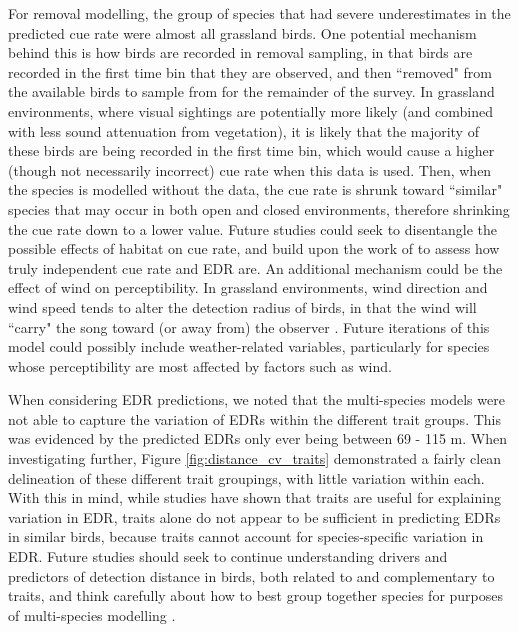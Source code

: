 \documentclass[12pt]{article}
\begin{document}
\par For removal modelling, the group of species that had severe underestimates in the predicted cue rate were almost all grassland birds.
One potential mechanism behind this is how birds are recorded in removal sampling, in that birds are recorded in the first time bin that they are observed, and then ``removed" from the available birds to sample from for the remainder of the survey.
In grassland environments, where visual sightings are potentially more likely (and combined with less sound attenuation from vegetation), it is likely that the majority of these birds are being recorded in the first time bin, which would cause a higher (though not necessarily incorrect) cue rate when this data is used.
Then, when the species is modelled without the data, the cue rate is shrunk toward ``similar" species that may occur in both open and closed environments, therefore shrinking the cue rate down to a lower value.
Future studies could seek to disentangle the possible effects of habitat on cue rate, and build upon the work of \citet{martin-schwarze_joint_2021} to assess how truly independent cue rate and EDR are.
An additional mechanism could be the effect of wind on perceptibility.
In grassland environments, wind direction and wind speed tends to alter the detection radius of birds, in that the wind will ``carry" the song toward (or away from) the observer \citep{rigby_factors_2019}.
Future iterations of this model could possibly include weather-related variables, particularly for species whose perceptibility are most affected by factors such as wind.

\par When considering EDR predictions, we noted that the multi-species models were not able to capture the variation of EDRs within the different trait groups.
This was evidenced by the predicted EDRs only ever being between 69 - 115 m.
When investigating further, Figure \ref{fig:distance_cv_traits} demonstrated a fairly clean delineation of these different trait groupings, with little variation within each.
With this in mind, while studies have shown that traits are useful for explaining variation in EDR, traits alone do not appear to be sufficient in predicting EDRs in similar birds, because traits cannot account for species-specific variation in EDR. 
Future studies should seek to continue understanding drivers and predictors of detection distance in birds, both related to and complementary to traits, and think carefully about how to best group together species for purposes of multi-species modelling \citep{pacifici_guidelines_2014}.
\end{document}
